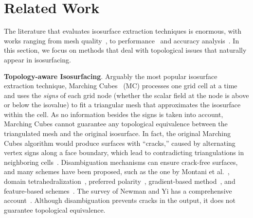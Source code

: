 \section{Related Work}
\label{sec:rw}
 
The literature that evaluates isosurface extraction
techniques is enormous, with works ranging from mesh
quality~\cite{Dietrich:TVCG:2008,Schreiner06,Raman:2008:QIM}, to
performance~\cite{Sutton00acase} and accuracy
analysis~\cite{patera04,zhou01}.
%
In this section, we focus
on methods that deal with
topological issues that naturally appear in isosurfacing. 

\textbf{Topology-aware Isosurfacing}.
Arguably the most popular isosurface extraction technique, Marching Cubes~\cite{lor87}
(MC) processes one grid cell 
at a time and uses the \emph{signs} of each grid node (whether
the scalar field at the node is above or below the isovalue) to fit a triangular mesh that
approximates the isosurface within the cell.
As no information besides the signs is taken into account, Marching
Cubes cannot guarantee any topological 
equivalence between the triangulated mesh and the original isosurface. In fact,
the original Marching
Cubes algorithm would produce surfaces with
``cracks,'' caused by alternating vertex signs along a face boundary,
which lead to contradicting triangulations in neighboring cells~\cite{Nielson:1991:ADR:949607.949621}.
Disambiguation mechanisms can ensure crack-free surfaces,
and many schemes have been proposed, such as
the one by Montani et al.~\cite{Montani:1994:MLT},
domain tetrahedralization~\cite{Hamish06}, 
preferred polarity~\cite{Bloomenthal88}, gradient-based method~\cite{gelder:tog:1994}, and
feature-based schemes~\cite{ho:cgf:2005}.
%
The survey of Newman and Yi has a comprehensive account~\cite{newman:candg:2006}.
%
Although disambiguation prevents cracks in the output, it does not
guarantee topological equivalence.

